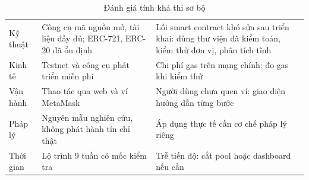 \begin{table}[!htbp]
    \centering
    \caption{Đánh giá tính khả thi sơ bộ}
    \label{tab:ks-khathi}
    \small
    \begin{tabularx}{\textwidth}{|L{2.2cm}|Y|Y|}
        \hline
         &  &  \\
        \hline
        Kỹ thuật & Công cụ mã nguồn mở, tài liệu đầy đủ; ERC-721, ERC-20 đã ổn định & Lỗi smart contract khó sửa sau triển khai: dùng thư viện đã kiểm toán, kiểm thử đơn vị, phân tích tĩnh \\
        \hline
        Kinh tế & Testnet và công cụ phát triển miễn phí & Chi phí gas trên mạng chính: đo gas khi kiểm thử \\
        \hline
        Vận hành & Thao tác qua web và ví MetaMask & Người dùng chưa quen ví: giao diện hướng dẫn từng bước \\
        \hline
        Pháp lý & Nguyên mẫu nghiên cứu, không phát hành tín chỉ thật & Áp dụng thực tế cần cơ chế pháp lý riêng \\
        \hline
        Thời gian & Lộ trình 9 tuần có mốc kiểm tra & Trễ tiến độ: cắt pool hoặc dashboard nếu cần \\
        \hline
    \end{tabularx}
\end{table}

